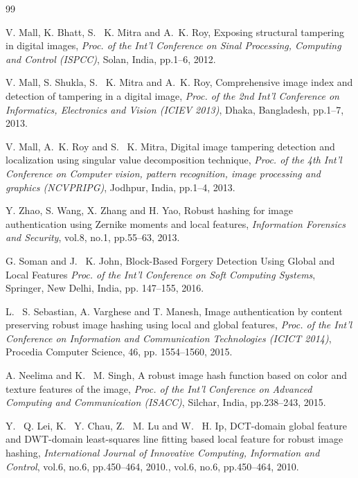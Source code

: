 \documentclass[12pt,a4paper]{jihmsp}
\begin{document}
{{	\begin {thebibliography}{99}
	
		V. Mall, K. Bhatt, S. ~K. Mitra and A.~K. Roy, Exposing structural tampering in digital images, {\em Proc. of the Int'l Conference on Sinal Processing, Computing and Control (ISPCC)}, Solan, India, pp.1--6, 2012.
		
		
		V. Mall, S. Shukla, S. ~K. Mitra and A.~K. Roy, Comprehensive image index and detection of tampering in a digital image, {\em Proc. of the 2nd Int'l Conference on Informatics, Electronics and Vision (ICIEV 2013)}, Dhaka, Bangladesh, pp.1--7, 2013.
		
		
		V. Mall, A.~K. Roy and S. ~K. Mitra, Digital image tampering detection and localization using singular value decomposition technique, {\em Proc. of the 4th Int'l Conference on Computer vision, pattern recognition, image processing and graphics (NCVPRIPG)}, Jodhpur, India, pp.1--4, 2013.
		
		
		
	 	Y. Zhao, S. Wang, X. Zhang and H. Yao,
		Robust hashing for image authentication using Zernike moments and local features, {\em Information Forensics and Security}, vol.8, no.1, pp.55--63, 2013.
		
		G. Soman and J. ~K. John,
		Block-Based Forgery Detection Using Global and Local Features {\em Proc. of the Int'l Conference on Soft Computing Systems}, Springer, New Delhi, India, pp. 147--155, 2016.
		
		
		L. ~S. Sebastian, A. Varghese and T. Manesh, Image authentication by content preserving robust image hashing using local and global features, {\em Proc. of the Int'l Conference on Information and Communication Technologies (ICICT 2014)}, Procedia Computer Science, 46, pp. 1554--1560, 2015.
		
		
		
		A. Neelima and K. ~M. Singh,
		A robust image hash function based on color and texture features of the image, {\em Proc. of the Int'l Conference on Advanced Computing and Communication (ISACC)}, Silchar, India, pp.238--243, 2015.
		
				
			
		Y. ~Q. Lei, K. ~Y. Chau, Z. ~M. Lu and W. ~H. Ip,
		DCT-domain global feature and DWT-domain least-squares line fitting based local feature for robust image hashing, {\em International Journal of Innovative Computing, Information and Control}, vol.6, no.6, pp.450--464, 2010., vol.6, no.6, pp.450--464, 2010.
		

\end{thebibliography}}}
\end{document}
